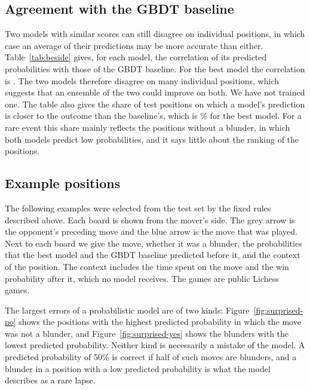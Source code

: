 \documentclass[11pt]{article}
\begin{document}
\subsection{Agreement with the GBDT baseline}

Two models with similar scores can still disagree on individual positions, in
which case an average of their predictions may be more accurate than either.
Table~\ref{tab:beside} gives, for each model, the correlation of its
predicted probabilities with those of the GBDT baseline. For the best model
the correlation is . The two models therefore
disagree on many individual positions, which suggests that an ensemble of the
two could improve on both. We have not trained one. The table also gives the
share of test positions on which a model's prediction is closer to the
outcome than the baseline's, which is \% for the best
model. For a rare event this share mainly reflects the positions without a
blunder, in which both models predict low probabilities, and it says little
about the ranking of the positions.

\begin{table}[htbp]\centering\small
{}
\caption{Agreement with the GBDT baseline on the test set: the correlation
between the two models' predicted probabilities, and the share of positions
on which the model's prediction is closer to the outcome than the
baseline's.}
\label{tab:beside}
\end{table}

\subsection{Example positions}
\label{sec:positions}

The following examples were selected from the test set by the fixed rules
described above. Each board is shown from the mover's side. The grey arrow is
the opponent's preceding move and the blue arrow is the move that was played.
Next to each board we give the move, whether it was a blunder, the
probabilities that the best model and the GBDT baseline predicted before it,
and the context of the position. The context includes the time spent on the
move and the win probability after it, which no model receives. The games
are public Lichess games.

The largest errors of a probabilistic model are of two kinds:
Figure~\ref{fig:surprised-no} shows the positions with the highest predicted
probability in which the move was not a blunder, and
Figure~\ref{fig:surprised-yes} shows the blunders with the lowest predicted
probability. Neither kind is necessarily a mistake of the model. A predicted
probability of 50\% is correct if half of such moves are blunders, and a
blunder in a position with a low predicted probability is what the model
describes as a rare lapse.
\end{document}
